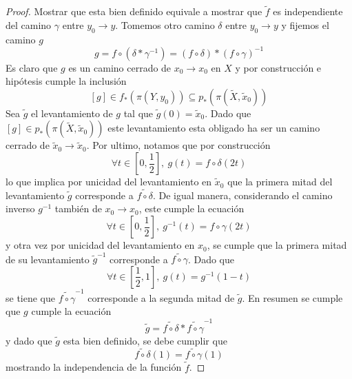 \begin{proof}
  Mostrar que esta bien definido equivale a mostrar que \(\tilde f\) es
  independiente del camino \(\gamma\) entre \(y_0 \to y\). Tomemos otro
  camino \(\delta\) entre \(y_0 \to y\) y fijemos el camino \(g\)
  \[ g = f \circ \left( \delta * \gamma^{-1} \right)
    = (f \circ \delta) * (f \circ \gamma)^{-1} \]
  Es claro que \(g\) es un camino cerrado de \(x_0 \to x_0\) en \(X\)
  y por construcción e hipótesis cumple la inclusión
  \[ [g] \in f_* \left( \pi (Y, y_0) \right) \subseteq p_* \left( \pi
      (\tilde X, \tilde x_0) \right)\]
  Sea \(\tilde g\) el levantamiento de \(g\) tal que \(\tilde g
  (0) = \tilde x_0\). Dado que \([g] \in p_* \left( \pi (\tilde X
    ,\tilde x_0) \right)\) este levantamiento esta obligado ha ser un
  camino cerrado de \(\tilde x_0 \to \tilde x_0\). Por ultimo, notamos
  que por construcción
  \[ \forall t \in [0, \frac 1 2],\ g(t) = f \circ \delta (2 t) \]
  lo que implica por unicidad del levantamiento en \(\tilde x_0\) que la
  primera mitad del levantamiento \(\tilde g\) corresponde a
  \(\widetilde{f \circ \delta}\). De igual manera, considerando el
  camino inverso \(g^{-1}\) también de \(x_0 \to x_0\), este cumple la
  ecuación
  \[ \forall t \in [0, \frac 1 2],\ g^{-1}(t) = f \circ \gamma (2 t) \]
  y otra vez por unicidad del levantamiento en \(x_0\), se cumple que la
  primera mitad de su levantamiento \(\tilde{g}^{-1}\) corresponde a
  \(\widetilde{f \circ \gamma}\). Dado que
  \[ \forall t \in [\frac 1 2 , 1],\ g(t) = g^{-1} (1 - t) \]
  se tiene que \(\widetilde{f \circ \gamma}^{-1}\) corresponde a la
  segunda mitad de \(\tilde g\). En resumen se cumple que \(g\) cumple
  la ecuación
  \[ \tilde g = \widetilde{f \circ \delta} * \widetilde{f \circ
    \gamma}^{-1} \]
  y dado que \(\tilde g\) esta bien definido, se debe cumplir que
  \[ \widetilde{f \circ \delta} (1) = \widetilde{f \circ \gamma} (1) \]
  mostrando la independencia de la función \(\tilde f\).


\end{proof}
